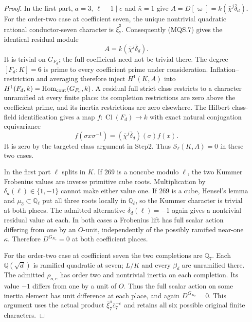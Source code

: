 \begin{proof}
In the first part, $a=3$, $\ell-1\mid e$ and
$\bar\kappa=1$ give
$A=D[\varpi]=k(\bar\chi^j\bar\delta_d)$.
For the order-two case at coefficient seven, the unique nontrivial
quadratic rational conductor-seven character is $\bar\xi_7^3$.
Consequently (MQS.7) gives the identical residual module
\[
                         A=k(\bar\chi^j\bar\delta_d).
 \tag{MQS.16}
\]
It is trivial on $G_{F_d}$; the full coefficient need not
be trivial there.  The degree $[F_d:K]=6$ is prime to
every coefficient prime under consideration.
Inflation--restriction and averaging therefore inject
$H^1(K,A)$ into $H^1(F_d,k)=\operatorname{Hom}_{\rm cont}(G_{F_d},k)$.
A residual full strict class restricts to a character
unramified at every finite place: its completion
restrictions are zero above the coefficient prime,
and its inertia restrictions are zero elsewhere.
The Hilbert class-field identification gives a map
$f:\operatorname{Cl}(F_d)\to k$ with exact natural
conjugation equivariance
\[
             f(\sigma x\sigma^{-1})=
                 (\bar\chi^j\bar\delta_d)(\sigma) f(x).
 \tag{MQS.17}
\]
It is zero by the targeted class argument in Step2.
Thus $\mathcal S_\ell(K,A)=0$ in these two cases.

In the first part $\ell$ splits in $K$.  If $269$ is a
noncube modulo $\ell$, the two Kummer Frobenius values
are inverse primitive cube roots.  Multiplication by
$\delta_d(\ell)\in\{1,-1\}$ cannot make either value one.
If $269$ is a cube, Hensel's lemma and
$\mu_3\subset\mathbb Q_\ell$ put all three roots locally
in $\mathbb Q_\ell$, so the Kummer character is trivial
at both places.  The admitted alternative
$\delta_d(\ell)=-1$ again gives a nontrivial residual
value at each.  In both cases a Frobenius lift has full
scalar action differing from one by an $O$-unit,
independently of the possibly ramified near-one $\kappa$.
Therefore $D^{G_{K_v}}=0$ at both coefficient places.

For the order-two case at coefficient seven the two completions
are $\mathbb Q_7$.
Each $\mathbb Q(\sqrt d)$ is ramified quadratic at seven;
$L/K$ and every $\beta_d$ are unramified there.
The admitted $\rho_{a,e}$ has order two and nontrivial
inertia on each completion.  Its value $-1$ differs
from one by a unit of $O$.  Thus the full scalar action
on some inertia element has unit difference at each
place, and again $D^{G_{K_v}}=0$.  This argument uses
the actual product $\bar\xi_7^a\bar c_7^{-e}$ and retains
all six possible original finite characters.


\end{proof}
